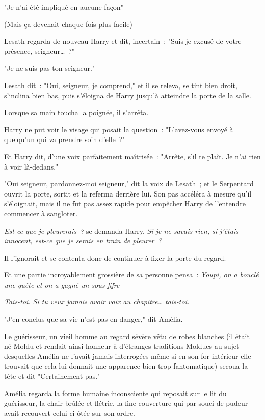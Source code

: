 "Je n'ai été impliqué en aucune façon"

(Mais ça devenait chaque fois plus facile)

Lesath regarda de nouveau Harry et dit, incertain~: "Suis-je excusé de votre présence, seigneur…~?"

"Je ne suis pas ton seigneur."

Lesath dit~: "Oui, seigneur, je comprend," et il se releva, se tint bien droit, s'inclina bien bas, puis s'éloigna de Harry jusqu'à atteindre la porte de la salle.

Lorsque sa main toucha la poignée, il s'arrêta.

Harry ne put voir le visage qui posait la question~: "L'avez-vous envoyé à quelqu'un qui va prendre soin d'elle~?"

Et Harry dit, d'une voix parfaitement maîtrisée~: "Arrête, s'il te plaît. Je n'ai rien à voir là-dedans."

"Oui seigneur, pardonnez-moi seigneur," dit la voix de Lesath~; et le Serpentard ouvrit la porte, sortit et la referma derrière lui. Son pas accéléra à mesure qu'il s'éloignait, mais il ne fut pas assez rapide pour empêcher Harry de l'entendre commencer à sangloter.

\emph{Est-ce que je pleurerais~?} se demanda Harry. \emph{Si je ne savais rien, si j'étais innocent, est-ce que je serais en train de pleurer~?}

Il l'ignorait et se contenta donc de continuer à fixer la porte du regard.

Et une partie incroyablement grossière de sa personne pensa~: \emph{Youpi, on a bouclé une quête et on a gagné un sous-fifre -}

\emph{Tais-toi. Si tu veux jamais avoir voix au chapitre… tais-toi.}


"J'en conclus que sa vie n'est pas en danger," dit Amélia.

Le guérisseur, un vieil homme au regard sévère vêtu de robes blanches (il était né-Moldu et rendait ainsi honneur à d'étranges traditions Moldues au sujet desquelles Amélia ne l'avait jamais interrogées même si en son for intérieur elle trouvait que cela lui donnait une apparence bien trop fantomatique) secoua la tête et dit "Certainement pas."

Amélia regarda la forme humaine inconsciente qui reposait sur le lit du guérisseur, la chair brûlée et flétrie, la fine couverture qui par souci de pudeur avait recouvert celui-ci ôtée sur son ordre.

